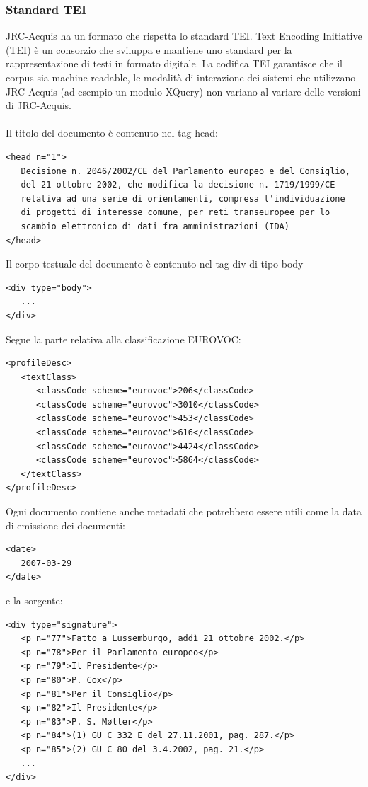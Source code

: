 \documentclass{article}
\theoremstyle{plain}
\theoremstyle{definition}
\begin{document}
\subsubsection{Standard TEI}
JRC-Acquis ha un formato che rispetta lo standard TEI.
Text Encoding Initiative (TEI) è un consorzio che sviluppa e mantiene uno standard per la rappresentazione di testi in formato digitale. La codifica TEI garantisce che il corpus sia machine-readable,  le modalità di interazione dei sistemi che utilizzano JRC-Acquis (ad esempio un modulo XQuery) non variano al variare delle versioni di JRC-Acquis.
\\
\\
Il titolo del documento è contenuto nel tag head:
\begin{verbatim}
<head n="1"> 
   Decisione n. 2046/2002/CE del Parlamento europeo e del Consiglio,
   del 21 ottobre 2002, che modifica la decisione n. 1719/1999/CE
   relativa ad una serie di orientamenti, compresa l'individuazione 
   di progetti di interesse comune, per reti transeuropee per lo 
   scambio elettronico di dati fra amministrazioni (IDA)
</head>
\end{verbatim}
Il corpo testuale del documento è contenuto nel tag div di tipo body
\begin{verbatim}
<div type="body">
   ...
</div>
\end{verbatim}
Segue la parte relativa alla classificazione EUROVOC:
\begin{verbatim}
<profileDesc>
   <textClass>
      <classCode scheme="eurovoc">206</classCode>
      <classCode scheme="eurovoc">3010</classCode>
      <classCode scheme="eurovoc">453</classCode>
      <classCode scheme="eurovoc">616</classCode>
      <classCode scheme="eurovoc">4424</classCode>
      <classCode scheme="eurovoc">5864</classCode>
   </textClass>
</profileDesc>
\end{verbatim}
Ogni documento contiene anche metadati che potrebbero essere utili come la data di emissione dei documenti:
\begin{verbatim}
<date>
   2007-03-29
</date>
\end{verbatim}
e la sorgente:
\begin{verbatim}
<div type="signature">
   <p n="77">Fatto a Lussemburgo, addì 21 ottobre 2002.</p>
   <p n="78">Per il Parlamento europeo</p>
   <p n="79">Il Presidente</p>
   <p n="80">P. Cox</p>
   <p n="81">Per il Consiglio</p>
   <p n="82">Il Presidente</p>
   <p n="83">P. S. Møller</p>
   <p n="84">(1) GU C 332 E del 27.11.2001, pag. 287.</p>
   <p n="85">(2) GU C 80 del 3.4.2002, pag. 21.</p>
   ... 
</div>
\end{verbatim}
\end{document}
